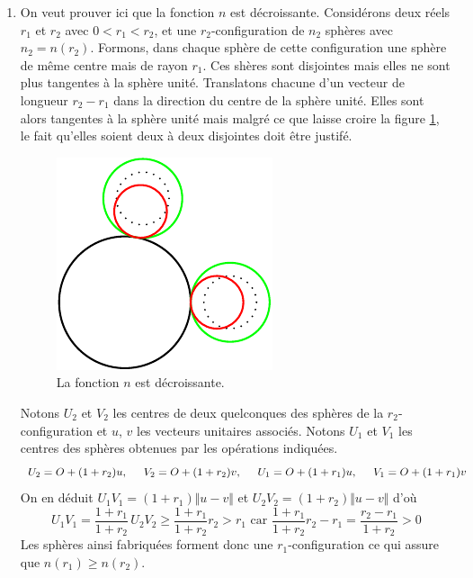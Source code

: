 \begin{enumerate}
 \item On veut prouver ici que la fonction $n$ est décroissante. Considérons deux réels $r_1$ et $r_2$ avec $0<r_1<r_2$, et une $r_2$-configuration de $n_2$ sphères avec $n_2=n(r_2)$. Formons, dans chaque sphère de cette configuration une sphère de même centre mais de rayon $r_1$. Ces shères sont disjointes mais elles ne sont plus tangentes à la sphère unité. Translatons chacune d'un vecteur de longueur $r_2-r_1$ dans la direction du centre de la sphère unité. Elles sont alors tangentes à la sphère unité mais malgré ce que laisse croire la figure \ref{fig:Csphertan_1}, le fait qu'elles soient deux à deux disjointes  doit être justifé.

\begin{figure}[h!t]
 \centering
 \includegraphics{./Csphertan_1.pdf}
 \caption{La fonction $n$ est décroissante.}
 \label{fig:Csphertan_1}
\end{figure}
Notons $U_2$ et $V_2$ les centres de deux quelconques des sphères de la $r_2$-configuration et $u$, $v$ les vecteurs unitaires associés. Notons $U_1$ et $V_1$ les centres des sphères obtenues par les opérations indiquées.
\begin{displaymath}
U_2 = O + (1+r_2)u,\hspace{0.5cm} V_2 = O + (1+r_2)v,\hspace{0.5cm} U_1=O+(1+r_1)u,\hspace{0.5cm} V_1=O+(1+r_1)v 
\end{displaymath}
On en déduit $U_1V_1=(1+r_1)\Vert u-v\Vert$ et $U_2V_2=(1+r_2)\Vert u-v\Vert$ d'où
\begin{displaymath}
 U_1V_1 = \frac{1+r_1}{1+r_2}\,U_2V_2 \geq \frac{1+r_1}{1+r_2}r_2 > r_1 
\text{ car }
\frac{1+r_1}{1+r_2}r_2 - r_1 = \frac{r_2-r_1}{1+r_2}>0
\end{displaymath}
Les sphères ainsi fabriquées forment donc une $r_1$-configuration ce qui assure que $n(r_1)\geq n(r_2)$.  

\end{enumerate}
